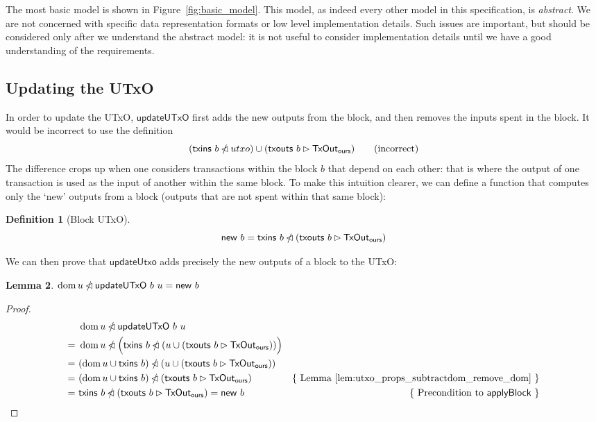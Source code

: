 \documentclass{article}
\newcommand{\restrictdom}{\lhd}
\newcommand{\subtractdom}{\mathbin{\slashed{\restrictdom}}}
\newcommand{\restrictrange}{\rhd}
\DeclareMathOperator{\dom}{dom}
\newtheorem{lemma}{Lemma}[section] %
\newtheorem{definition}[lemma]{Definition}
\numberwithin{equation}{lemma}
\begin{document}
The most basic model is shown in Figure~\ref{fig:basic_model}. This model, as
indeed every other model in this specification, is \emph{abstract}. We are not
concerned with specific data representation formats or low level implementation
details. Such issues are important, but should be considered only after we
understand the abstract model: it is not useful to consider implementation
details until we have a good understanding of the requirements.

\subsection{Updating the UTxO}

In order to update the UTxO, $\mathsf{updateUTxO}$ first adds the new outputs
from the block, and then removes the inputs spent in the block. It would be
incorrect to use the definition
%
\begin{equation*}
(\mathsf{txins} ~ b \subtractdom utxo)  \cup (\mathsf{txouts} ~ b \restrictrange \mathsf{TxOut_{ours}})
\tag{incorrect}
\end{equation*}
%
The difference crops up when one considers transactions within the block $b$
that depend on each other: that is where the output of one transaction is used
as the input of another within the same block. To make this intuition clearer,
we can define a function that computes only the `new' outputs from a block
(outputs that are not spent within that same block):
%
\begin{definition}[Block UTxO]
\begin{equation*}
\mathsf{new} ~ b = \mathsf{txins} ~ b \subtractdom (\mathsf{txouts} ~ b \restrictrange \mathsf{TxOut_{ours}})
\end{equation*}
\end{definition}
%
We can then prove that $\mathsf{updateUtxo}$ adds precisely the new outputs
of a block to the UTxO:
%
\begin{lemma} \label{lem:update_remove_dom}
\begin{math}
\dom u \subtractdom \mathsf{updateUTxO} ~ b ~ u  = \mathsf{new} ~ b
\end{math}
\end{lemma}
%
\begin{proof}
\begin{align*}
  & ~ \dom u \subtractdom \mathsf{updateUTxO} ~ b ~ u \\
= & ~ \dom u \subtractdom \Bigl( \mathsf{txins} ~ b \subtractdom (u \cup (\mathsf{txouts} ~ b \restrictrange \mathsf{TxOut_{ours}})) \Bigr) \\
= & ~ (\dom u \cup \mathsf{txins} ~ b) \subtractdom (u \cup (\mathsf{txouts} ~ b \restrictrange \mathsf{TxOut_{ours}})) \\
= & ~ (\dom u \cup \mathsf{txins} ~ b) \subtractdom (\mathsf{txouts} ~ b \restrictrange \mathsf{TxOut_{ours}}) & \text{\{ Lemma~\ref{lem:utxo_props_subtractdom_remove_dom} \}} \\
= & ~ \mathsf{txins} ~ b \subtractdom (\mathsf{txouts} ~ b \restrictrange \mathsf{TxOut_{ours}}) = \mathsf{new} ~ b & \text{\{ Precondition to $\mathsf{applyBlock}$ \}}
\end{align*}
\end{proof}
\end{document}
